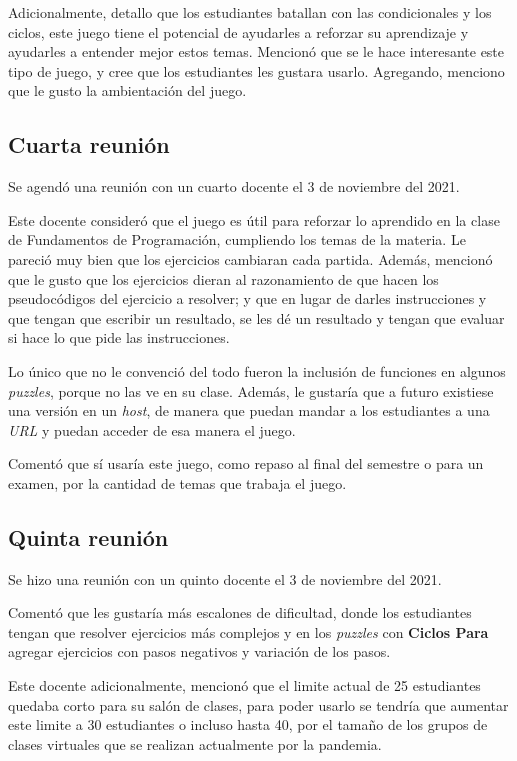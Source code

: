 Adicionalmente, detallo que los estudiantes batallan con las condicionales y los ciclos, este juego tiene el potencial de ayudarles a reforzar su aprendizaje y ayudarles a entender mejor estos temas. Mencionó que se le hace interesante este tipo de juego, y cree que los estudiantes les gustara usarlo. Agregando, menciono que le gusto la ambientación del juego.

\subsection{Cuarta reunión}
Se agendó una reunión con un cuarto docente el 3 de noviembre del 2021. 

Este docente consideró que el juego es útil para reforzar lo aprendido en la clase de Fundamentos de Programación, cumpliendo los temas de la materia. Le pareció muy bien que los ejercicios cambiaran cada partida. Además, mencionó que le gusto que los ejercicios dieran al razonamiento de que hacen los pseudocódigos del ejercicio a resolver; y que en lugar de darles instrucciones y que tengan que escribir un resultado, se les dé un resultado y tengan que evaluar si hace lo que pide las instrucciones.

Lo único que no le convenció del todo fueron la inclusión de funciones en algunos \textit{puzzles}, porque no las ve en su clase. Además, le gustaría que a futuro existiese una versión en un \textit{host}, de manera que puedan mandar a los estudiantes a una \textit{URL} y puedan acceder de esa manera el juego.

Comentó que sí usaría este juego, como repaso al final del semestre o para un examen, por la cantidad de temas que trabaja el juego.

\subsection{Quinta reunión}
Se hizo una reunión con un quinto docente el 3 de noviembre del 2021.

Comentó que les gustaría más escalones de dificultad, donde los estudiantes tengan que resolver ejercicios más complejos y en los \textit{puzzles} con \textbf{Ciclos Para} agregar ejercicios con pasos negativos y variación de los pasos.

Este docente adicionalmente, mencionó que el limite actual de 25 estudiantes quedaba corto para su salón de clases, para poder usarlo se tendría que aumentar este limite a 30 estudiantes o incluso hasta 40, por el tamaño de los grupos de clases virtuales que se realizan actualmente por la pandemia.

